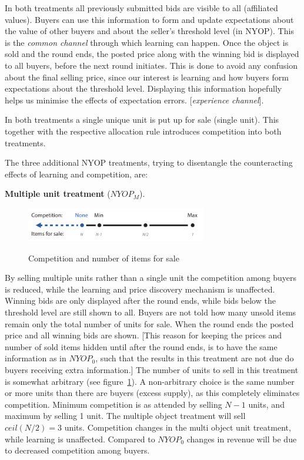 \documentclass[a4paper,12pt]{article}
\begin{document}
	In both treatments all previously submitted bids are visible to all (affiliated values). Buyers can use this information to form and update expectations about the value of other buyers and about the seller's threshold level (in NYOP). This is the \emph{common channel} through which learning can happen. Once the object is sold and the round ends, the posted price along with the winning bid is displayed to all buyers, before the next round initiates. This is done to avoid any confusion about the final selling price, since our interest is learning and how buyers form expectations about the threshold level. Displaying this information hopefully helps us minimise the effects of expectation errors. [\emph{experience channel}].

	In both treatments a single unique unit is put up for sale (single unit). This together with the respective allocation rule introduces competition into both treatments.

	The three additional NYOP treatments, trying to disentangle the counteracting effects of learning and competition, are:

	{\bf Multiple unit treatment} ($NYOP_M$). 
	
	\begin{figure}[h]
	        \centering
	        \caption{Competition and number of items for sale}
	        \includegraphics[width=0.7\textwidth]{Figures/Competition-Items}
			\label{fig:competition-items}
	\end{figure}
	
	By selling multiple units rather than a single unit the competition among buyers is reduced, while the learning and price discovery mechanism is unaffected. Winning bids are only displayed after the round ends, while bids below the threshold level are still shown to all. Buyers are not told how many unsold items remain only the total number of units for sale. When the round ends the posted price and all winning bids are shown. [This reason for keeping the prices and number of sold items hidden until after the round ends, is to have the same information as in $NYOP_0$, such that the results in this treatment are not due do buyers receiving extra information.] The number of units to sell in this treatment is somewhat arbitrary (see figure~\ref{fig:competition-items}). A non-arbitrary choice is the same number or more units than there are buyers (excess supply), as this completely eliminates competition. Minimum competition is as attended by selling $N-1$ units, and maximum by selling 1 unit. The multiple object treatment will sell $ceil(N/2)=3$ units. Competition changes in the multi object unit treatment, while learning is unaffected. Compared to $NYOP_0$ changes in revenue will be due to decreased competition among buyers.
\end{document}
